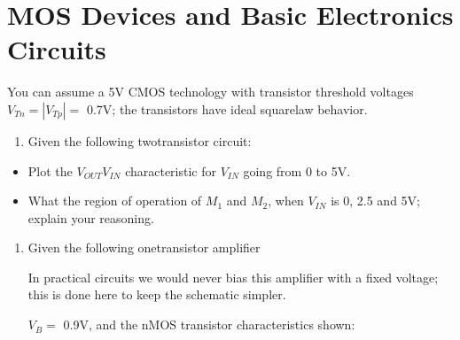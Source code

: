 \documentclass[letterpaper,10pt,english]{jupyterBook}
\begin{document}
\section{MOS Devices and Basic Electronics Circuits}
\label{\detokenize{TestYourKnowledge/AEC_prereq_test/AEC_entry_test:mos-devices-and-basic-electronics-circuits}}
\sphinxAtStartPar
You can assume a 5V CMOS technology with transistor threshold voltages \(V_{Tn} = |V_{Tp}| = \) 0.7V; the transistors have ideal square\sphinxhyphen{}law behavior.
\begin{enumerate}
%
\item {} 
\sphinxAtStartPar
Given the following two\sphinxhyphen{}transistor circuit:

\end{enumerate}

\sphinxAtStartPar
{}
\begin{itemize}
\item {} 
\sphinxAtStartPar
Plot the \(V_{OUT}\)\sphinxhyphen{}\(V_{IN}\) characteristic for \(V_{IN}\) going from 0 to 5V.

\item {} 
\sphinxAtStartPar
What the region of operation of \(M_1\) and \(M_2\), when \(V_{IN}\) is 0, 2.5 and 5V; explain your reasoning.

\end{itemize}
\begin{enumerate}
%
\setcounter{enumi}{1}
\item {} 
\sphinxAtStartPar
Given the following one\sphinxhyphen{}transistor amplifier%
\begin{footnote}[1]\sphinxAtStartFootnote
In practical circuits we would never bias this amplifier with a fixed voltage; this is done here to keep the schematic simpler.
%
\end{footnote}  \(V_B = \) 0.9V, and the nMOS transistor characteristics shown:

\end{enumerate}
\end{document}
